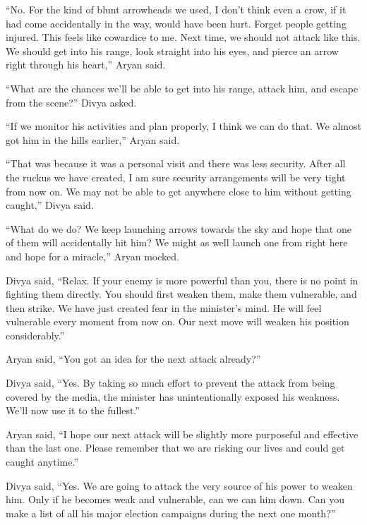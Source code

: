 “No. For the kind of blunt arrowheads we used, I don't think even a crow, if
it had come accidentally in the way, would have been hurt. Forget people getting
injured. This feels like cowardice to me. Next time, we should not attack like
this. We should get into his range, look straight into his eyes, and pierce an
arrow right through his heart,” Aryan said.

“What are the chances we'll be able to get into his range, attack him, and escape
from the scene?” Divya asked.

“If we monitor his activities and plan properly, I think we can do that. We
almost got him in the hills earlier,” Aryan said.

“That was because it was a personal visit and there was less security. After all
the ruckus we have created, I am sure security arrangements will be very tight
from now on. We may not be able to get anywhere close to him without getting
caught,” Divya said.

“What do we do? We keep launching arrows towards the sky and hope that one of
them will accidentally hit him? We might as well launch one from right here and
hope for a miracle,” Aryan mocked.

Divya said, “Relax. If your enemy is more powerful than you, there is no point
in fighting them directly. You should first weaken them, make them vulnerable,
and then strike. We have just created fear in the minister's mind. He will
feel vulnerable every moment from now on. Our next move will weaken his position
considerably.”

Aryan said, “You got an idea for the next attack already?”

Divya said, “Yes. By taking so much effort to prevent the attack from being
covered by the media, the minister has unintentionally exposed his weakness.
We'll now use it to the fullest.”

Aryan said, “I hope our next attack will be slightly more purposeful and
effective than the last one. Please remember that we are risking our lives and
could get caught anytime.”

Divya said, “Yes. We are going to attack the very source of his power to weaken
him. Only if he becomes weak and vulnerable, can we can him down. Can you make
a list of all his major election campaigns during the next one month?”